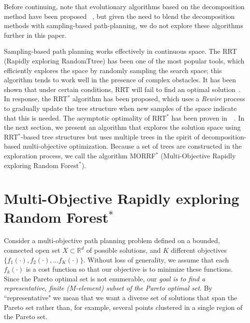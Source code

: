 \documentclass{article}
\begin{document}
Before continuing, note that evolutionary algorithms based on the decomposition method have been proposed ~\cite{6600851}, but given the need to blend the decomposition methods with sampling-based path-planning, we do not explore these algorithms further in this paper.

Sampling-based path planning works effectively in continuous space. 
The RRT (Rapidly exploring RandomTtree) has been one of the most popular tools, which  efficiently explores the space by randomly sampling the search space; this algorithm tends to work well in the presence of complex obstacles.
It has been shown that under certain conditions, RRT will fail to find an optimal solution~\cite{Karaman.Frazzoli:RSS10}. 
In response, the RRT$^{*}$ algorithm has been proposed, which uses a \emph{Rewire} process to gradually update the tree structure when new samples of the space indicate that this is needed.
The asymptotic optimality of RRT$^{*}$ has been proven in~\cite{Karaman.Frazzoli:RSS10}~\cite{Karaman:2011:SAO:2000201.2000209}. 
In the next section, we present an algorithm that explores the solution space using RRT$^{*}$-based tree structures but uses multiple trees in the spirit of decomposition-based multi-objective optimization.
Because a set of trees are constructed in the exploration process, we call the algorithm MORRF$^{*}$ (Multi-Objective Rapidly exploring Random Forest$^{*}$).


\section{Multi-Objective Rapidly exploring Random Forest$^{*}$}
\label{sec:morrt}

Consider a multi-objective path planning problem defined on a bounded, connected open set $X\subset\mathbb{R}^d$ of possible solutions, and $K$ different objectives $\{f_1(\cdot), f_2(\cdot), ... f_{K}(\cdot)\}$. 
Without loss of generality, we assume that each $f_k(\cdot)$ is a cost function so that our objective is to minimize these functions.  
Since the Pareto optimal set is not enumerable, our {\em goal is to find a representative, finite ($M$-element) subset of the Pareto optimal set}.  
By ``representative" we mean that we want a diverse set of solutions that span the Pareto set rather than, for example, several points clustered in a single region of the Pareto set.  
\end{document}
